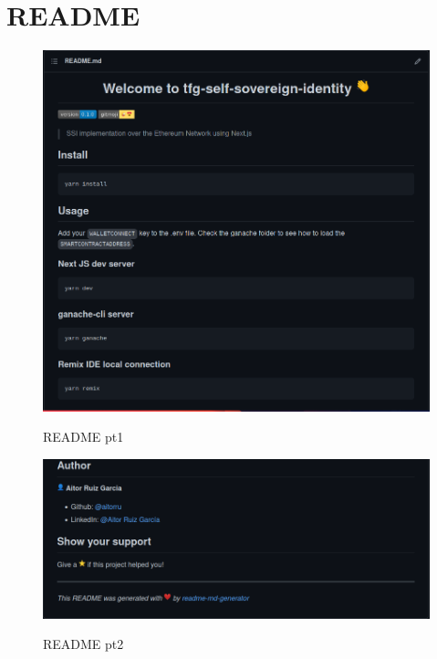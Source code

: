 \documentclass[a4paper,openright,11pt]{book}
\begin{document}
\section{README}
\begin{figure}[H]
    \centering
    \includegraphics[width=1\textwidth]{Figures/gh1.png}
    \caption{README pt1}
    \cite{web:repo}
\end{figure}
\begin{figure}[H]
    \centering
    \includegraphics[width=1\textwidth]{Figures/gh2.png}
    \caption{README pt2}
    \cite{web:repo}
\end{figure}
\end{document}

